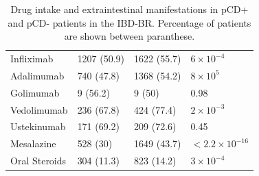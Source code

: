 \begin{table}
\begin{tabular}[t]{llll}
  \hspace{1em}Infliximab & 1207 (50.9) & 1622 (55.7) & $6\times10^{-4}$\\
  \hspace{1em}Adalimumab & 740 (47.8) & 1368 (54.2) & $8\times10^{5}$\\
  \hspace{1em}Golimumab & 9 (56.2) & 9 (50) & 0.98\\
  \hspace{1em}Vedolimumab & 236 (67.8) & 424 (77.4) & $2\times10^{-3}$\\
  \hspace{1em}Ustekinumab & 171 (69.2) & 209 (72.6) & 0.45\\
  \hspace{1em}Mesalazine & 528 (30) & 1649 (43.7) & $< 2.2\times10^{-16}$\\
  \hspace{1em}Oral Steroids & 304 (11.3) & 823 (14.2) & $3\times10^{-4}$\\
 
  \bottomrule
  \end{tabular}
  \caption{Drug intake and extraintestinal manifestations in pCD+ and pCD- patients in the IBD-BR. Percentage of patients are shown between paranthese.}
  \label{table:drug_eim}
  \end{table}
  
